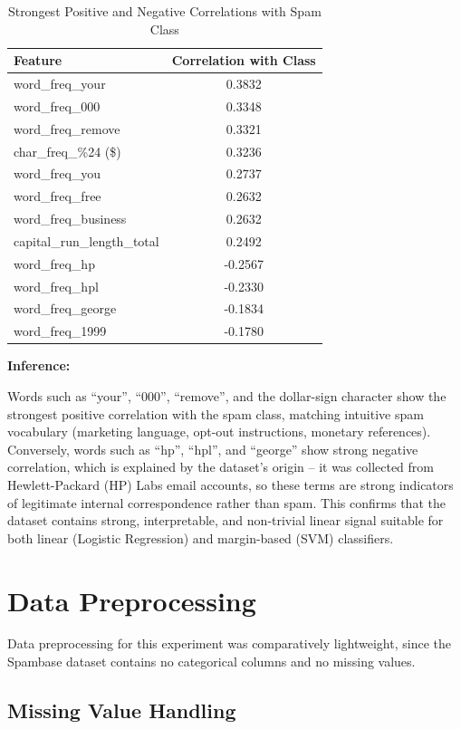 \documentclass[12pt,a4paper]{article}
\begin{document}
\begin{table}[H]
\centering
\begin{tabular}{lc}
\toprule
Feature & Correlation with Class \\
\midrule
word\_freq\_your & 0.3832 \\
word\_freq\_000 & 0.3348 \\
word\_freq\_remove & 0.3321 \\
char\_freq\_\%24 (\$) & 0.3236 \\
word\_freq\_you & 0.2737 \\
word\_freq\_free & 0.2632 \\
word\_freq\_business & 0.2632 \\
capital\_run\_length\_total & 0.2492 \\
\midrule
word\_freq\_hp & -0.2567 \\
word\_freq\_hpl & -0.2330 \\
word\_freq\_george & -0.1834 \\
word\_freq\_1999 & -0.1780 \\
\bottomrule
\end{tabular}
\caption{Strongest Positive and Negative Correlations with Spam Class}
\end{table}

\textbf{Inference:}

Words such as ``your'', ``000'', ``remove'', and the dollar-sign character show the strongest positive correlation with the spam class, matching intuitive spam vocabulary (marketing language, opt-out instructions, monetary references). Conversely, words such as ``hp'', ``hpl'', and ``george'' show strong negative correlation, which is explained by the dataset's origin -- it was collected from Hewlett-Packard (HP) Labs email accounts, so these terms are strong indicators of legitimate internal correspondence rather than spam. This confirms that the dataset contains strong, interpretable, and non-trivial linear signal suitable for both linear (Logistic Regression) and margin-based (SVM) classifiers.

\section{Data Preprocessing}

Data preprocessing for this experiment was comparatively lightweight, since the Spambase dataset contains no categorical columns and no missing values.

\subsection{Missing Value Handling}
\end{document}
